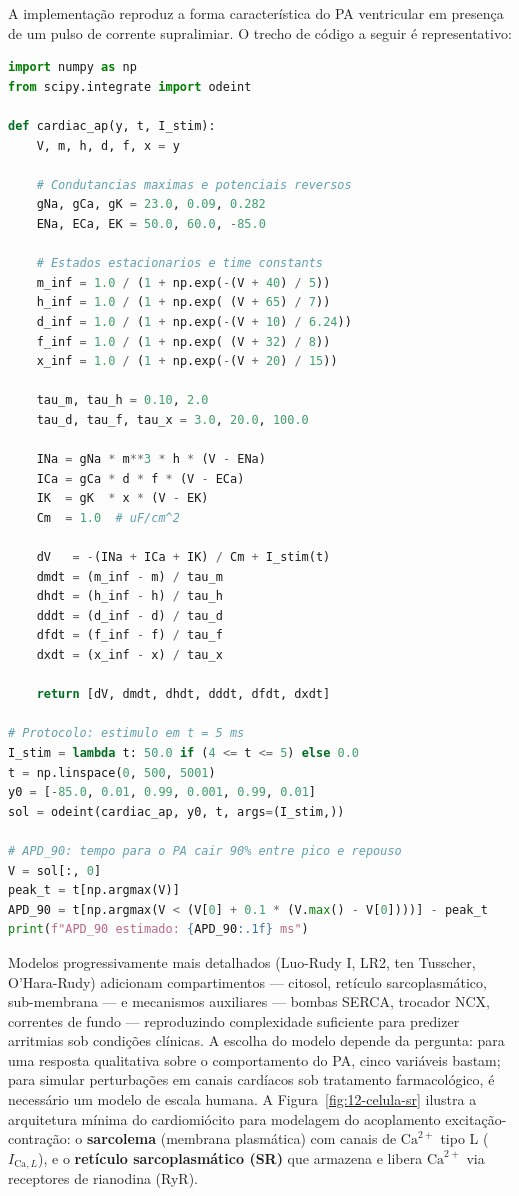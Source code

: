 A implementação reproduz a forma característica do PA ventricular em
presença de um pulso de corrente supralimiar. O trecho de código a
seguir é representativo:

\begin{lstlisting}[language=Python, caption=PA ventricular simplificado (5 variaveis)]
import numpy as np
from scipy.integrate import odeint

def cardiac_ap(y, t, I_stim):
    V, m, h, d, f, x = y

    # Condutancias maximas e potenciais reversos
    gNa, gCa, gK = 23.0, 0.09, 0.282
    ENa, ECa, EK = 50.0, 60.0, -85.0

    # Estados estacionarios e time constants
    m_inf = 1.0 / (1 + np.exp(-(V + 40) / 5))
    h_inf = 1.0 / (1 + np.exp( (V + 65) / 7))
    d_inf = 1.0 / (1 + np.exp(-(V + 10) / 6.24))
    f_inf = 1.0 / (1 + np.exp( (V + 32) / 8))
    x_inf = 1.0 / (1 + np.exp(-(V + 20) / 15))

    tau_m, tau_h = 0.10, 2.0
    tau_d, tau_f, tau_x = 3.0, 20.0, 100.0

    INa = gNa * m**3 * h * (V - ENa)
    ICa = gCa * d * f * (V - ECa)
    IK  = gK  * x * (V - EK)
    Cm  = 1.0  # uF/cm^2

    dV   = -(INa + ICa + IK) / Cm + I_stim(t)
    dmdt = (m_inf - m) / tau_m
    dhdt = (h_inf - h) / tau_h
    dddt = (d_inf - d) / tau_d
    dfdt = (f_inf - f) / tau_f
    dxdt = (x_inf - x) / tau_x

    return [dV, dmdt, dhdt, dddt, dfdt, dxdt]

# Protocolo: estimulo em t = 5 ms
I_stim = lambda t: 50.0 if (4 <= t <= 5) else 0.0
t = np.linspace(0, 500, 5001)
y0 = [-85.0, 0.01, 0.99, 0.001, 0.99, 0.01]
sol = odeint(cardiac_ap, y0, t, args=(I_stim,))

# APD_90: tempo para o PA cair 90% entre pico e repouso
V = sol[:, 0]
peak_t = t[np.argmax(V)]
APD_90 = t[np.argmax(V < (V[0] + 0.1 * (V.max() - V[0])))] - peak_t
print(f"APD_90 estimado: {APD_90:.1f} ms")
\end{lstlisting}

Modelos progressivamente mais detalhados (Luo-Rudy I, LR2, ten Tusscher,
O'Hara-Rudy) adicionam compartimentos --- citosol, retículo sarcoplasmático,
sub-membrana --- e mecanismos auxiliares --- bombas SERCA, trocador
NCX, correntes de fundo --- reproduzindo complexidade suficiente para
predizer arritmias sob condições clínicas. A escolha do modelo depende
da pergunta: para uma resposta qualitativa sobre o comportamento do
PA, cinco variáveis bastam; para simular perturbações em canais
cardíacos sob tratamento farmacológico, é necessário um modelo de
escala humana. A Figura~\ref{fig:12-celula-sr} ilustra a
arquitetura mínima do cardiomiócito para modelagem do acoplamento
excitação-contração: o \textbf{sarcolema} (membrana plasmática) com
canais de $\mathrm{Ca}^{2+}$ tipo L ($I_{\mathrm{Ca},L}$), e o
\textbf{retículo sarcoplasmático (SR)} que armazena e libera
$\mathrm{Ca}^{2+}$ via receptores de rianodina (RyR).

